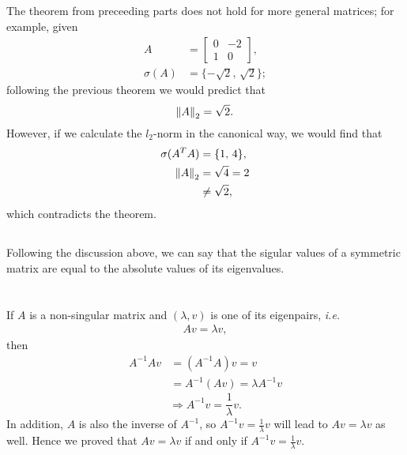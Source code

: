 \documentclass[11pt]{article}
\begin{document}
\subsection{}
The theorem from preceeding parts does not hold for more general matrices; for example, given 
\begin{equation}\begin{split} A &= \begin{bmatrix} 0 & -2 \\ 1 & 0\end{bmatrix},\\
\sigma(A) &= \{-\sqrt{2} ,\, \sqrt{2} \};
  \end{split}\nonumber\end{equation} 
following the previous theorem we would predict that 
$$\norm{A}_2 = \sqrt{2}. $$
However, if we calculate the $l_2$-norm in the canonical way, we would find that 
\begin{equation}\begin{split} \sigma(A^TA) &= \{1,\,4\},\\ 
\norm{A}_2 &= \sqrt{4} = 2\\&\neq\sqrt{2},  
\end{split}\nonumber\end{equation}
which contradicts the theorem. 
\subsection{}
Following the discussion above, we can say that the sigular values of a symmetric matrix are equal to the absolute values of its eigenvalues.

\section{}
\subsection{}
If $A$ is a non-singular matrix and $(\lambda, v)$ is one of its eigenpairs, \textit{i.e.}
\begin{equation}\begin{split} Av = \lambda v, \end{split}\nonumber\end{equation} then 
\begin{equation}\begin{split} A^{-1}Av &= (A^{-1}A)v = v \\ &= A^{-1}(Av) = \lambda A^{-1}v \end{split}\nonumber\end{equation}
$$\Rightarrow A^{-1}v = \frac1{\lambda}v.$$
In addition, $A$ is also the inverse of $A^{-1}$, so $A^{-1}v=\frac1{\lambda}v$ will lead to $Av = \lambda v$ as well. Hence we proved that $Av=\lambda v$ if and only if $A^{-1 }v = \frac1{\lambda}v$.
\end{document}
